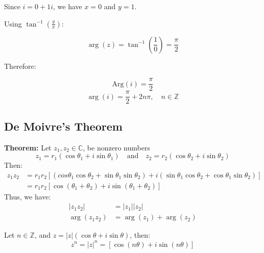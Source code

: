 \documentclass[a4paper,12pt]{article} %
\theoremstyle{definition}
\theoremstyle{plain}
\begin{document}
\begin{examplebox}
Since $i = 0 + 1i$, we have $x = 0$ and $y = 1$.

Using $\tan^{-1}\left(\frac{y}{x}\right)$:

\[
\arg(z) = \tan^{-1}\left(\frac{1}{0}\right) = \frac{\pi}{2}
\]

Therefore:

\[
\text{Arg}(i) = \frac{\pi}{2}
\]
\[
\arg(i) = \frac{\pi}{2} + 2n\pi, \quad n \in \mathbb{Z}
\]
\end{examplebox}

\pagebreak

\subsection{De Moivre's Theorem}
\textbf{Theorem:} Let $z_1,z_2 \in \mathbb{C}$, be nonzero numbers
$$z_1 = r_1(\cos\theta_1 + i\sin\theta_1) \quad \text{and} \quad z_2 = r_2(\cos\theta_2 + i\sin\theta_2)$$
Then: 
\begin{align*}
  z_1z_2 &= r_1r_2[(cos\theta_1\cos\theta_2  + \sin\theta_1\sin\theta_2) + i(\sin\theta_1\cos\theta_2 + \cos\theta_1\sin\theta_2)] \\
  &= r_1r_2[\cos(\theta_1 + \theta_2) + i\sin(\theta_1 + \theta_2)]
\end{align*}
Thus, we have:
\begin{align*}
  |z_1z_2| &= |z_1||z_2| \\
  \arg(z_1z_2) &= \arg(z_1) + \arg(z_2)
\end{align*}

\begin{theorembox}
  Let $n \in \mathbb{Z}$, and $z = |z|(\cos\theta + i\sin\theta)$, then:
  $$z^n = |z|^n = [\cos(n\theta) + i\sin(n\theta)]$$
\end{theorembox}
\end{document}
